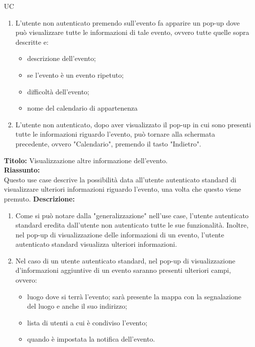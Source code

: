 \begin{listaPersonale}{UC}
\begin{listaPersonale2} [UC] {}
\begin{enumerate}
\begin{itemize}
                  \end{itemize}
                  \begin{comment} "può comprendere a quale calendario o raggruppamento appartiene l'evento" \end{comment}
            \item L'utente non autenticato premendo sull'evento fa apparire un pop-up dove può visualizzare tutte le informazioni di tale evento, ovvero tutte quelle sopra descritte e:
                  \begin{itemize}
                      \item descrizione dell'evento;
                      \item se l'evento è un evento ripetuto;
                      \item difficoltà dell'evento;
                      \item nome del calendario di appartenenza
                  \end{itemize}
            \item L'utente non autenticato, dopo aver visualizzato il pop-up in cui sono presenti tutte le informazioni riguardo l'evento, può tornare alla schermata precedente, ovvero "Calendario", premendo il tasto "Indietro".
        \end{enumerate}
        \textbf{Titolo: } Visualizzazione altre informazione dell'evento. \\
        \textbf{Riassunto: } \\ Questo use case descrive la possibilità data all'utente autenticato standard di visualizzare ulteriori informazioni riguardo l'evento, una volta che questo viene premuto.
        \textbf{Descrizione: }
        \begin{enumerate}
            \item Come si può notare dalla "generalizzazione" nell'use case, l'utente autenticato standard eredita dall'utente non autenticato tutte le sue funzionalità. Inoltre, nel pop-up di visualizzazione delle informazioni di un evento, l'utente autenticato standard visualizza ulteriori informazioni.
            \item Nel caso di un utente autenticato standard, nel pop-up di visualizzazione d'informazioni aggiuntive di un evento saranno presenti ulteriori campi, ovvero:
                  \begin{itemize}
                      \item luogo dove si terrà l'evento; sarà presente la mappa con la segnalazione del luogo e anche il suo indirizzo;
                      \item lista di utenti a cui è condiviso l'evento;
                      \item quando è impostata la notifica dell'evento.
                  \end{itemize}
        \end{enumerate}


\end{listaPersonale2}
\end{listaPersonale}
